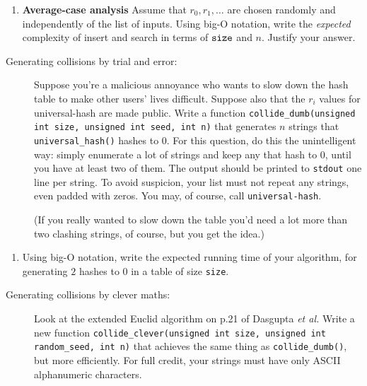 \documentclass[11pt]{article}
\newcommand{\size}{{\tt size}}
\begin{document}
\begin{enumerate}[resume]
    \item {\bf Average-case analysis}
        Assume that $r_0, r_1, \ldots$ are chosen randomly and independently of the list of inputs.
        Using big-O notation,
        write the \emph{expected} complexity of insert and search in terms of $\size$ and $n$.
        Justify your answer.
\end{enumerate}

\begin{description}
    \item[Generating collisions by trial and error: ]
        Suppose you're a malicious annoyance who wants to slow down the hash table to make other users' lives difficult.
        Suppose also that the $r_i$ values for universal-hash are made public.
        Write a function
        {\tt collide\_dumb(unsigned int size, unsigned int seed, int n)}
        that generates $n$ strings that {\tt universal\_hash()} hashes to 0.
        For this question, do this the unintelligent way: simply enumerate a lot of
        strings and keep any that hash to 0, until you have at least two of them.
        The output should be printed to {\tt stdout} one line per string.
        To avoid suspicion, your list must not repeat any strings, even padded with zeros.
        You may, of course, call {\tt universal-hash}.

(If you really wanted to slow down the table you'd need a lot more than two clashing strings,
of course,
but you get the idea.)
\end{description}

\begin{enumerate}[resume]
\item Using big-O notation,
    write the expected running time of your algorithm,
    for generating $2$ hashes to 0 in a table of size {\tt size}.
\end{enumerate}

\begin{description}
\item[Generating collisions by clever maths: ]
    Look at the extended Euclid algorithm on p.21 of Dasgupta {\it et al.}
        Write a new function
        {\tt collide\_clever(unsigned int size, unsigned int random\_seed, int n)}
        that achieves the same thing as {\tt collide\_dumb()},
        but more efficiently.
        For full credit,
        your strings must have only ASCII alphanumeric characters.
\end{description}
\end{document}
